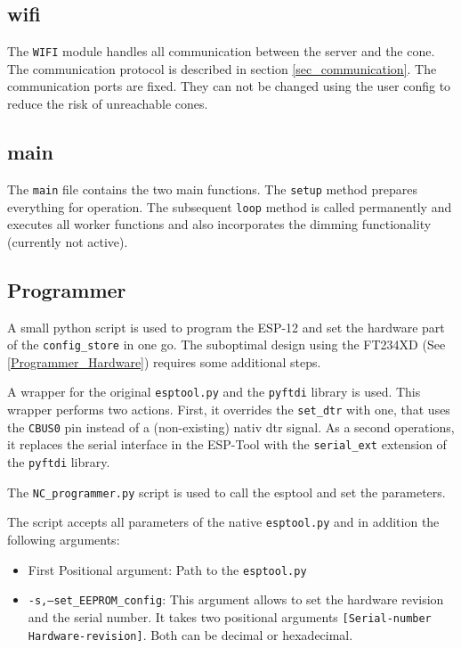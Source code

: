 \subsection{wifi}
The \texttt{WIFI} module handles all communication between the server and the cone. The communication protocol is described in section \ref{sec_communication}. The communication ports are fixed. They can not be changed using the user config to reduce the risk of unreachable cones. 

\subsection{main}
The \texttt{main} file contains the two main functions. The \texttt{setup} method prepares everything for operation. The subsequent \texttt{loop} method is called permanently and executes all worker functions and also incorporates the dimming functionality (currently not active). 

\subsection{Programmer}
\label{programmer_software}

A small python script is used to program the ESP-12 and set the hardware part of the \texttt{config\_store} in one go. The suboptimal design using the FT234XD (See \ref{Programmer_Hardware}) requires some additional steps. 

A wrapper for the original \texttt{esptool.py} and the \texttt{pyftdi} library is used. This wrapper performs two actions. First, it overrides the \texttt{set\_dtr} with one, that uses the \texttt{CBUS0} pin instead of a (non-existing) nativ dtr signal. As a second operations, it replaces the serial interface in the ESP-Tool with the \texttt{serial\_ext} extension of the \texttt{pyftdi} library.

The \texttt{NC\_programmer.py} script is used to call the esptool and set the parameters. 

The script accepts all parameters of the native \texttt{esptool.py} and in addition the following arguments: 
\begin{itemize}
	\item First Positional argument: Path to the \texttt{esptool.py}
	\item \texttt{-s,--set\_EEPROM\_config}: This argument allows to set the hardware revision and the serial number. It takes two positional arguments \texttt{[Serial-number Hardware-revision]}.	Both can be decimal or hexadecimal. 
\end{itemize}

